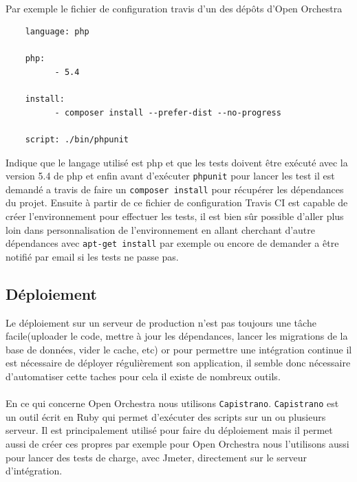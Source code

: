 \paragraph{}
Par exemple le fichier de configuration travis d'un des dépôts d'Open Orchestra 
\begin{verbatim}
    language: php

    php:
          - 5.4

    install:
          - composer install --prefer-dist --no-progress
 
    script: ./bin/phpunit
\end{verbatim}

Indique que le langage utilisé est php et que les tests doivent être exécuté avec la version 5.4 de php et enfin avant d'exécuter \verb?phpunit? pour lancer les test il est demandé a travis de faire un \verb?composer install? pour récupérer les dépendances du projet.  Ensuite à partir de ce fichier de configuration Travis CI est capable de créer l'environnement pour effectuer les tests, il est bien sûr possible d'aller plus loin dans  personnalisation de l'environnement en allant cherchant d'autre dépendances avec \verb?apt-get install? par exemple ou encore de demander a être notifié par email si les tests ne passe pas.

\subsection{Déploiement}
Le déploiement sur un serveur de production n'est pas toujours une tâche facile(uploader le code, mettre à jour les dépendances, lancer les migrations de la base de données, vider le cache, etc)  or pour permettre une intégration continue il est nécessaire de déployer régulièrement son application, il semble donc nécessaire d'automatiser cette taches pour cela il existe de nombreux outils. 
\paragraph{}
En ce qui concerne Open Orchestra nous utilisons \verb?Capistrano?. \verb?Capistrano? est un outil écrit en Ruby qui permet d'exécuter des scripts sur un ou plusieurs serveur. Il est principalement utilisé pour faire du déploiement mais il permet aussi de créer ces propres par exemple pour Open Orchestra nous l'utilisons aussi pour lancer des tests de charge, avec Jmeter, directement sur le serveur d'intégration.
